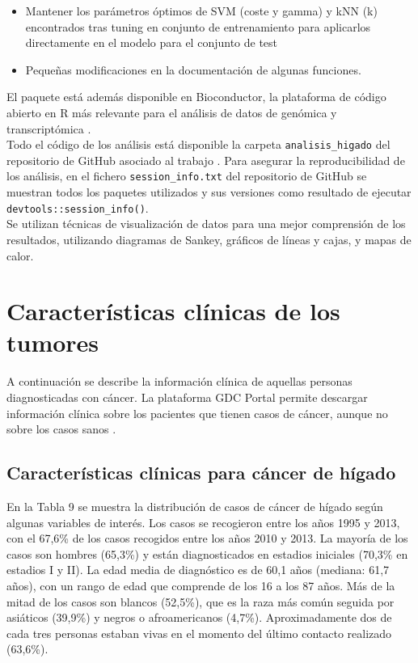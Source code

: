 \begin{itemize}
	\item{Mantener los parámetros óptimos de SVM (coste y gamma) y kNN (k) encontrados tras tuning en conjunto de entrenamiento para aplicarlos directamente en el modelo para el conjunto de test}
	\item Pequeñas modificaciones en la documentación de algunas funciones.
\end{itemize}

El paquete está además disponible en Bioconductor, la plataforma de código abierto en R más relevante para el análisis de datos de genómica y transcriptómica \cite{Gentleman2004}.\\

Todo el código de los análisis está disponible la carpeta \texttt{analisis\_higado} del repositorio de GitHub asociado al trabajo \cite{Redondo-Sanchez2020}. Para asegurar la reproducibilidad de los análisis, en el fichero \texttt{session\_info.txt} del repositorio de GitHub \cite{Redondo-Sanchez2020} se muestran todos los paquetes utilizados y sus versiones como resultado de ejecutar \texttt{devtools::session\_info()}.\\

Se utilizan técnicas de visualización de datos para una mejor comprensión de los resultados, utilizando diagramas de Sankey, gráficos de líneas y cajas, y mapas de calor.\\

\section{Características clínicas de los tumores}
 
A continuación se describe la información clínica de aquellas personas diagnosticadas con cáncer. La plataforma GDC Portal permite descargar información clínica sobre los pacientes que tienen casos de cáncer, aunque no sobre los casos sanos \cite{GDCPortal} . 

\subsection{Características clínicas para cáncer de hígado}

En la Tabla 9 se muestra  la distribución de casos de cáncer de hígado según algunas variables de interés. Los casos se recogieron entre los años 1995 y 2013, con el 67,6\% de los casos recogidos entre los años 2010 y 2013. La mayoría de los casos son hombres (65,3\%) y están diagnosticados en estadios iniciales (70,3\% en estadios I y II). La edad media de diagnóstico es de 60,1 años (mediana: 61,7 años), con un rango de edad que comprende de los 16 a los 87 años. Más de la mitad de los casos son blancos (52,5\%), que es la raza más común seguida por asiáticos (39,9\%) y negros o afroamericanos (4,7\%). Aproximadamente dos de cada tres personas estaban vivas en el momento del último contacto realizado (63,6\%).\\

